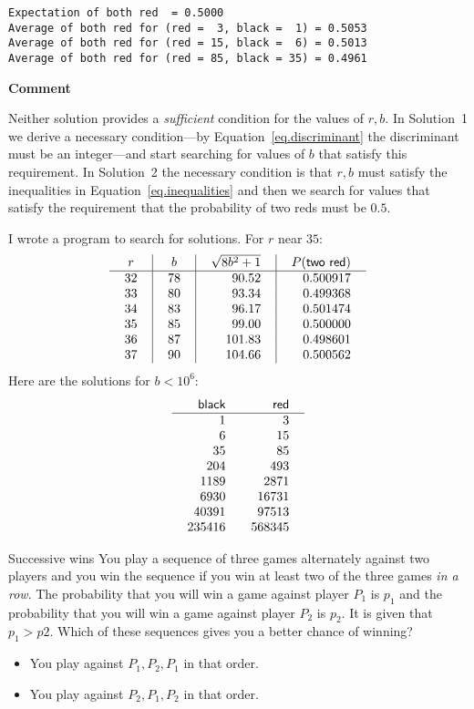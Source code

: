\medskip
\sml{}
\begin{verbatim}
Expectation of both red  = 0.5000
Average of both red for (red =  3, black =  1) = 0.5053
Average of both red for (red = 15, black =  6) = 0.5013
Average of both red for (red = 85, black = 35) = 0.4961
\end{verbatim}

\textbf{Comment}

Neither solution provides a \emph{sufficient} condition for the values of $r,b$. In Solution~1 we derive a necessary condition---by Equation~\ref{eq.discriminant} the discriminant must be an integer---and start searching for values of $b$ that satisfy this requirement. In Solution~2 the necessary condition is that $r,b$ must satisfy the inequalities in Equation~\ref{eq.inequalities} and then we search for values that satisfy the requirement that the probability of two reds must be $0.5$.

I wrote a program to search for solutions. For $r$ near $35$:
\[
\renewcommand{\arraycolsep}{12pt}
\begin{array}{r|r|r|r}
\multicolumn{1}{c|}{r}&
\multicolumn{1}{c|}{b}&
\multicolumn{1}{c|}{\sqrt{8b^2+1}}&
\multicolumn{1}{c}{P(\textsf{two red})} \\\hline
32 & 78  & 90.52 & 0.500917\\
33 & 80  & 93.34 & 0.499368\\
34 & 83  & 96.17 & 0.501474\\
35 & 85  & 99.00 & 0.500000\\
36 & 87  &101.83 & 0.498601\\
37 & 90  &104.66 & 0.500562
\end{array}
\]
Here are the solutions for $b<10^6$:
\[
\begin{array}{r@{\hspace{2em}}r}
\textsf{black} & \textsf{red}\\\hline
1 & 3 \\
6 & 15\\
35 &  85\\
204 &  493\\
1189 &  2871\\
6930 & 16731\\
40391 &  97513\\
235416 & 568345
\end{array}
\]


\begin{prob}{Successive wins}
You play a sequence of three games alternately against two players and you win the sequence if you win at least two of the three games \emph{in a row}. The probability that you will win a game against player $P_1$ is $p_1$ and the probability that you will win a game against player $P_2$ is $p_2$. It is given that $p_1>p2$. Which of these sequences gives you a better chance of winning?
\begin{itemize}
\item You play against $P_1,P_2,P_1$ in that order.
\item You play against $P_2,P_1,P_2$ in that order.
\end{itemize}
\end{prob}


